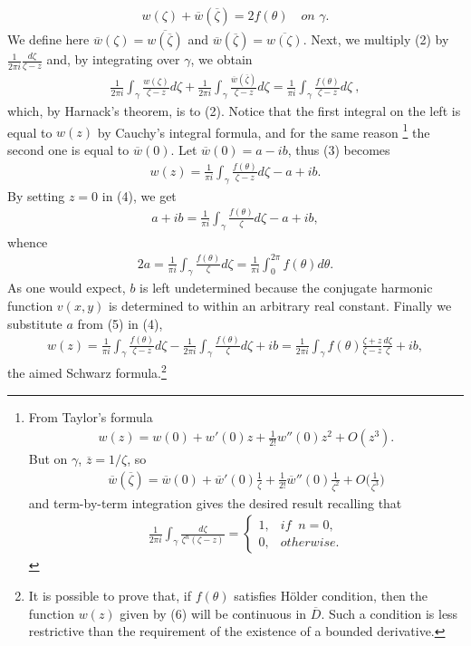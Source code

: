 \documentclass[12pt]{article}
\begin{document}
\begin{align}
w(\zeta)+\overline{w}(\overline{\zeta})=2f(\theta) \quad on \,\, \gamma.
\end{align}
We define here $\overline{w}(\zeta)=\overline{w(\overline{\zeta})}$ and $\overline{w}(\overline{\zeta})=\overline{w(\zeta)}$. Next, we multiply (2) by $\frac{1}{2\pi i}\frac{d\zeta}{\zeta-z}$ and, by integrating over $\gamma$, we obtain
\begin{align}
\frac{1}{2\pi i}\int_\gamma\frac{w(\zeta)}{\zeta-z}d\zeta+
\frac{1}{2\pi i}\int_\gamma\frac{\overline{w}(\overline{\zeta})}{\zeta-z}d\zeta
=\frac{1}{\pi i}\int_\gamma\frac{f(\theta)}{\zeta-z}d\zeta\:,
\end{align}
which, by Harnack's theorem, is  to (2). Notice that the first integral on the left is equal to $w(z)$ by Cauchy's integral formula, and for the same reason {\footnote{From Taylor's formula
\begin{align*}
w(z)=w(0)+w'(0)z+\frac{1}{2!}w''(0)z^2+O(z^3).
\end{align*}
But on $\gamma$,\; $\overline{z}=1/\zeta$, so
\begin{align*}
\overline{w}(\overline{\zeta})=\overline{w}(0)+\overline{w}'(0)\frac{1}{\zeta}+
\frac{1}{2!}\overline{w}''(0)\frac{1}{\zeta^2}+O\bigg(\frac{1}{\zeta^3}\bigg)
\end{align*}
and term-by-term integration gives the desired result recalling that
\begin{align*}
\frac{1}{2\pi i}\int_\gamma\frac{d\zeta}{\zeta^n(\zeta-z)}=
\left\{ \begin{array}{ll}
1, & if \;\; n=0, \\
0, & otherwise.
\end{array}
\right.
\end{align*}}} the second one is equal to $\overline{w}(0)$. Let $\overline{w}(0)=a-ib$, thus (3) becomes
\begin{align}
w(z)=\frac{1}{\pi i}\int_\gamma\frac{f(\theta)}{\zeta-z}d\zeta-a+ib.
\end{align}
By setting $z=0$ in (4), we get
\begin{align*}
a+ib=\frac{1}{\pi i}\int_\gamma\frac{f(\theta)}{\zeta}d\zeta-a+ib,
\end{align*}
whence
\begin{align}
2a=\frac{1}{\pi i}\int_\gamma\frac{f(\theta)}{\zeta}d\zeta=
\frac{1}{\pi i}\int_0^{2\pi} f(\theta)d\theta.
\end{align}
As one would expect, $b$ is left undetermined because the conjugate harmonic function $v(x,y)$ is determined to within an arbitrary real constant. Finally we substitute $a$ from (5) in (4),
\begin{align}
w(z)=\frac{1}{\pi i}\int_\gamma\frac{f(\theta)}{\zeta-z}d\zeta-
\frac{1}{2\pi i}\int_\gamma\frac{f(\theta)}{\zeta}d\zeta+ib=
\frac{1}{2\pi i}\int_\gamma f(\theta)\frac{\zeta+z}{\zeta-z}\frac{d\zeta}{\zeta}
+ib,
\end{align}
the aimed Schwarz formula.{\footnote{It is possible to prove that, if $f(\theta)$ satisfies H\"older condition, then the function $w(z)$ given by (6) will be continuous in $\overline{D}$. Such a condition is less restrictive than the requirement of the existence of a bounded derivative.}}
\end{document}
